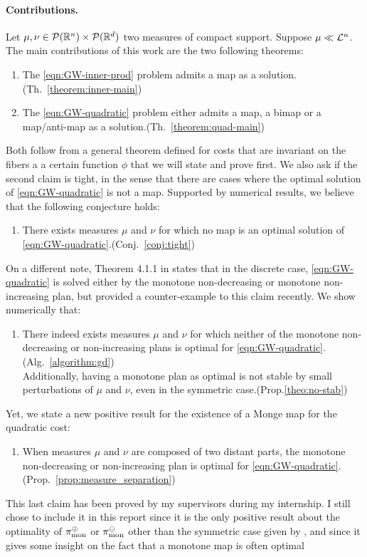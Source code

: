 \paragraph{Contributions.}
Let $\mu, \nu\in \mathcal{P}(\mathbb{R}^n)\times\mathcal{P}(\mathbb{R}^d)$ two measures of compact support. Suppose $\mu\ll\mathcal{L}^n$. The main contributions of this work are the two following theorems:
\begin{enumerate}[label=(\roman*)]
    \item The \cref{eqn:GW-inner-prod} problem admits a map as a solution.\hfill(Th.~\ref{theorem:inner-main})
    \item The \cref{eqn:GW-quadratic} problem either admits a map, a bimap or a map/anti-map as a solution.\hfill(Th.~\ref{theorem:quad-main})
\end{enumerate}
Both follow from a general theorem defined for costs that are invariant on the fibers a a certain function $\phi$ that we will state and prove first.
We also ask if the second claim is tight, in the sense that there are cases where the optimal solution of \cref{eqn:GW-quadratic} is not a map. Supported by numerical results, we believe that the following conjecture holds:
\begin{enumerate}[label=(\roman*),start=3]
    \item There exists measures $\mu$ and $\nu$ for which no map is an optimal solution of \cref{eqn:GW-quadratic}.\hfill(Conj.~\ref{conj:tight})
\end{enumerate}
On a different note, Theorem 4.1.1 in \cite{vayer2020contribution} states that in the discrete case, \cref{eqn:GW-quadratic} is solved either by the monotone non-decreasing or monotone non-increasing plan, but \cite{beinert2022assignment} provided a counter-example to this claim recently. We show numerically that:
\begin{enumerate}[label=(\roman*),start=4]
    \item There indeed exists measures $\mu$ and $\nu$ for which neither of the monotone non-decreasing or non-increasing plans is optimal for \cref{eqn:GW-quadratic}.\hfill(Alg.~\ref{algorithm:gd})\\
    Additionally, having a monotone plan as optimal is not stable by small perturbations of $\mu$ and $\nu$, even in the symmetric case.\hfill(Prop.\ref{theo:no-stab})
\end{enumerate}
Yet, we state a new positive result for the existence of a Monge map for the quadratic cost:
\begin{enumerate}[label=(\roman*),start=5]
    \item When measures $\mu$ and $\nu$ are composed of two distant parts, the monotone non-decreasing or non-increasing plan is optimal for \cref{eqn:GW-quadratic}.\hfill(Prop.~\ref{prop:measure_separation})
\end{enumerate}
This last claim has been proved by my supervisors during my internship. I still chose to include it in this report since it is the only positive result about the optimality of $\pi_\text{mon}^\oplus$ or $\pi_\text{mon}^\ominus$ other than the symmetric case given by \cite{sturm2012space}, and since it gives some insight on the fact that a monotone map is often optimal
